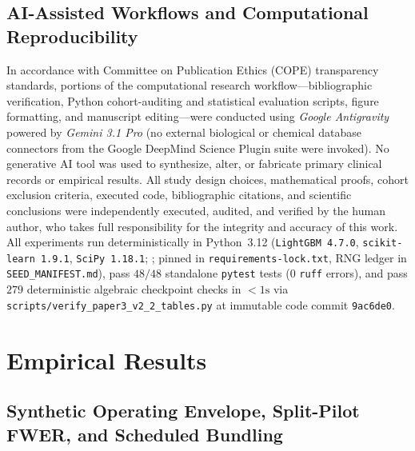\documentclass[11pt]{article}
\theoremstyle{remark}
\begin{document}
\subsection{AI-Assisted Workflows and Computational Reproducibility}
\label{sec:ai_disclosure}

In accordance with Committee on Publication Ethics (COPE) transparency standards, portions of the computational research workflow---bibliographic verification, Python cohort-auditing and statistical evaluation scripts, figure formatting, and manuscript editing---were conducted using \emph{Google Antigravity} powered by \emph{Gemini 3.1 Pro} (no external biological or chemical database connectors from the Google DeepMind Science Plugin suite were invoked). No generative AI tool was used to synthesize, alter, or fabricate primary clinical records or empirical results. All study design choices, mathematical proofs, cohort exclusion criteria, executed code, bibliographic citations, and scientific conclusions were independently executed, audited, and verified by the human author, who takes full responsibility for the integrity and accuracy of this work. All experiments run deterministically in Python~3.12 (\texttt{LightGBM~4.7.0}, \texttt{scikit-learn~1.9.1}, \texttt{SciPy~1.18.1}; \citealp{ke2017lightgbm,pedregosa2011scikit,virtanen2020scipy}; pinned in \texttt{requirements-lock.txt}, RNG ledger in \texttt{SEED\_MANIFEST.md}), pass $48/48$ standalone \texttt{pytest} tests ($0$ \texttt{ruff} errors), and pass $279$ deterministic algebraic checkpoint checks in $<1\text{s}$ via \texttt{scripts/verify\_paper3\_v2\_2\_tables.py} at immutable code commit \texttt{9ac6de0}.

\section{Empirical Results}
\label{sec:results}

\subsection{Synthetic Operating Envelope, Split-Pilot FWER, and Scheduled Bundling}
\label{sec:synth_results}
\end{document}
